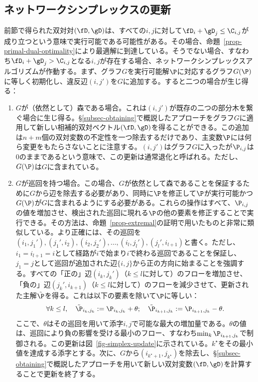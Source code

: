 \subsection{ネットワークシンプレックスの更新}
前節で得られた双対対$(\fD,\gD)$は、すべての$i,j$に対して$\fD_i+\gD_j\leq \C_{i,j}$が成り立つという意味で実行可能である可能性がある。その場合、命題~\ref{prop-primal-dual-optimality}により最適解に到達している。そうでない場合、すなわち$\fD_i+\gD_j> \C_{i,j}$となる$i,j$が存在する場合、ネットワークシンプレックスアルゴリズムが作動する。まず、グラフ$G$を実行可能解$\P$に対応するグラフ$G(\P)$に等しく初期化し、違反辺$(i,j')$を$G$に追加する。すると二つの場合が生じ得る：
\begin{enumerate}[label={(\alph*)}]
	\item $G$が（依然として）森である場合。これは$(i,j')$が既存の二つの部分木を繋ぐ場合に生じ得る。\S\ref{subsec-obtaining}で概説したアプローチをグラフ$G$に適用して新しい相補的双対ベクトル$(\fD,\gD)$を得ることができる。この追加は$n+m$個の双対変数の不定性を一つ除去するだけであり、主変数$\P$には何ら変更をもたらさないことに注意する。$(i,j')$はグラフ$G$に入ったが$\P_{i,j}$は$0$のままであるという意味で、この更新は通常退化と呼ばれる。ただし、$G(\P)$は$G$に含まれている。

	\item $G$が巡回を持つ場合。この場合、$G$が依然として森であることを保証するために$G$から辺を除去する必要があり、同時に$\P$を修正して$\P$が実行可能かつ$G(\P)$が$G$に含まれるようにする必要がある。これらの操作はすべて、$\P_{i,j}$の値を増加させ、検出された巡回に現れる$\P$の他の要素を修正することで実行できる。その方法は、命題~\ref{prop-extremal}の証明で用いたものと非常に類似している。より正確には、その巡回を$(i_1,j_1'), (j_1',i_2), (i_2,j_2'),\dots, (i_l,j_l'),(j_l',i_{l+1})$と書く。ただし、$i_1=i_{l+1}=i$として経路が$i$で始まり$i$で終わる巡回であることを保証し、$j_1=j$として巡回が追加された辺$\{i,j\}$から正の方向に始まることを強調する。すべての「正の」辺$(i_k,j_k')$（$k\leq l$に対して）のフローを増加させ、「負の」辺$(j_k',i_{k+1})$（$k\leq l$に対して）のフローを減少させて、更新された主解$\tilde{\P}$を得る。これは以下の要素を除いて$\P$に等しい：
$$\forall k\leq l,\quad \tilde{\P}_{i_k,j_k}:= \P_{i_k,j_k}+\theta;\quad \tilde{\P}_{i_{k+1},j_k}:= \P_{i_{k+1},j_k}-\theta.$$
ここで、$\theta$はその巡回を用いて添字$i,j$で可能な最大の増加量である。$\theta$の値は、巡回により負の影響を受ける最小のフロー、すなわち$\min_{k} \P_{i_{k+1},j_k}$で制御される。この更新は図~\ref{fig-simplex-update}に示されている。$k^\star$をその最小値を達成する添字とする。次に、$G$から$(i_{k^\star+1},j_{k^\star})$を除去し、\S\ref{subsec-obtaining}で概説したアプローチを用いて新しい双対変数$(\fD,\gD)$を計算することで更新を終了する。
\end{enumerate}

